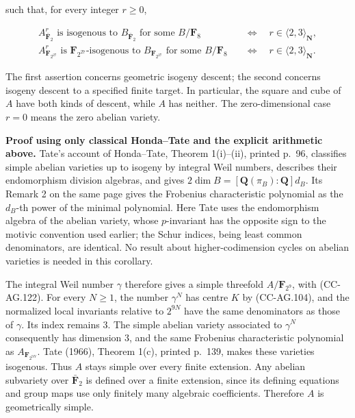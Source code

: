 such that, for every integer \(r\ge0\),

\[
 \begin{aligned}
 A_{\bar{\mathbf F}_2}^{r}
  \text{ is isogenous to }B_{\bar{\mathbf F}_2}
  \text{ for some }B/\mathbf F_8
 &\quad\Longleftrightarrow\quad r\in\langle2,3\rangle_{\mathbf N},\\
 A_{\mathbf F_{2^{27}}}^{r}
  \text{ is }\mathbf F_{2^{27}}\text{-isogenous to }
        B_{\mathbf F_{2^{27}}}
  \text{ for some }B/\mathbf F_8
 &\quad\Longleftrightarrow\quad r\in\langle2,3\rangle_{\mathbf N}.
 \end{aligned}
 \tag{CC-AG.123}
\]

The first assertion concerns geometric isogeny descent; the second
concerns isogeny descent to a specified finite target. In particular,
the square and cube of \(A\) have both kinds of descent, while \(A\) has
neither. The zero-dimensional case \(r=0\) means the zero abelian
variety.

\textbf{Proof using only classical Honda--Tate and the explicit
arithmetic above.} Tate's account of Honda--Tate, Theorem 1(i)--(ii),
printed p.~96, classifies simple abelian varieties up to isogeny by
integral Weil numbers, describes their endomorphism division algebras,
and gives \(2\dim B=[\mathbf Q(\pi_B):\mathbf Q]d_B\). Its Remark 2 on
the same page gives the Frobenius characteristic polynomial as the
\(d_B\)-th power of the minimal polynomial. Here Tate uses the
endomorphism algebra of the abelian variety, whose \(p\)-invariant has
the opposite sign to the motivic convention used earlier; the Schur
indices, being least common denominators, are identical. No result about
higher-codimension cycles on abelian varieties is needed in this
corollary.

The integral Weil number \(\gamma\) therefore gives a simple threefold
\(A/\mathbf F_{2^9}\), with (CC-AG.122). For every \(N\ge1\), the number
\(\gamma^N\) has centre \(K\) by (CC-AG.104), and the normalized local
invariants relative to \(2^{9N}\) have the same denominators as those of
\(\gamma\). Its index remains \(3\). The simple abelian variety
associated to \(\gamma^N\) consequently has dimension \(3\), and the
same Frobenius characteristic polynomial as \(A_{\mathbf F_{2^{9N}}}\).
Tate (1966), Theorem 1(c), printed p.~139, makes these varieties
isogenous. Thus \(A\) stays simple over every finite extension. Any
abelian subvariety over \(\bar{\mathbf F}_2\) is defined over a finite
extension, since its defining equations and group maps use only finitely
many algebraic coefficients. Therefore \(A\) is geometrically simple.

